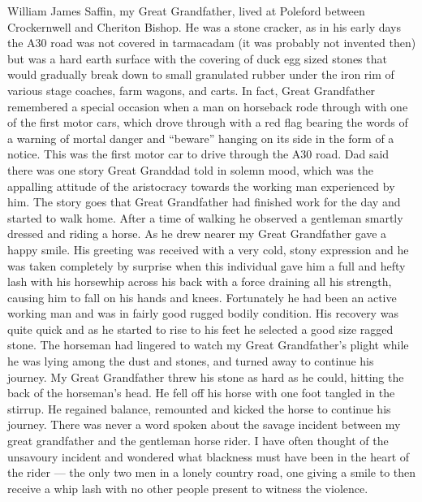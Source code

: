 
William James Saffin, my Great Grandfather, lived at Poleford between
Crockernwell and Cheriton Bishop. He was a stone cracker, as in his early days
the A30 road was not covered in tarmacadam (it was probably not invented then)
but was a hard earth surface with the covering of duck egg sized stones that
would gradually break down to small granulated rubber under the iron rim of
various stage coaches, farm wagons, and carts. In fact, Great Grandfather
remembered a special occasion when a man on horseback rode through with one of
the first motor cars, which drove through with a red flag bearing the words of
a warning of mortal danger and ``beware'' hanging on its side in the form of a
notice. This was the first motor car to drive through the A30 road. Dad said
there was one story Great Granddad told in solemn mood, which was the appalling
attitude of the aristocracy towards the working man experienced by him. The
story goes that Great Grandfather had finished work for the day and started to
walk home. After a time of walking he observed a gentleman smartly dressed and
riding a horse. As he drew nearer my Great Grandfather gave a happy smile. His
greeting was received with a very cold, stony expression and he was taken
completely by surprise when this individual gave him a full and hefty lash with
his horsewhip across his back with a force draining all his strength, causing
him to fall on his hands and knees. Fortunately he had been an active working
man and was in fairly good rugged bodily condition. His recovery was quite
quick and as he started to rise to his feet he selected a good size ragged
stone. The horseman had lingered to watch my Great Grandfather's plight while
he was lying among the dust and stones, and turned away to continue his
journey. My Great Grandfather threw his stone as hard as he could, hitting the
back of the horseman's head. He fell off his horse with one foot tangled in the
stirrup. He regained balance, remounted and kicked the horse to continue his
journey. There was never a word spoken about the savage incident between my
great grandfather and the gentleman horse rider. I have often thought of the
unsavoury incident and wondered what blackness must have been in the heart of
the rider --- the only two men in a lonely country road, one giving a smile to
then receive a whip lash with no other people present to witness the violence.

